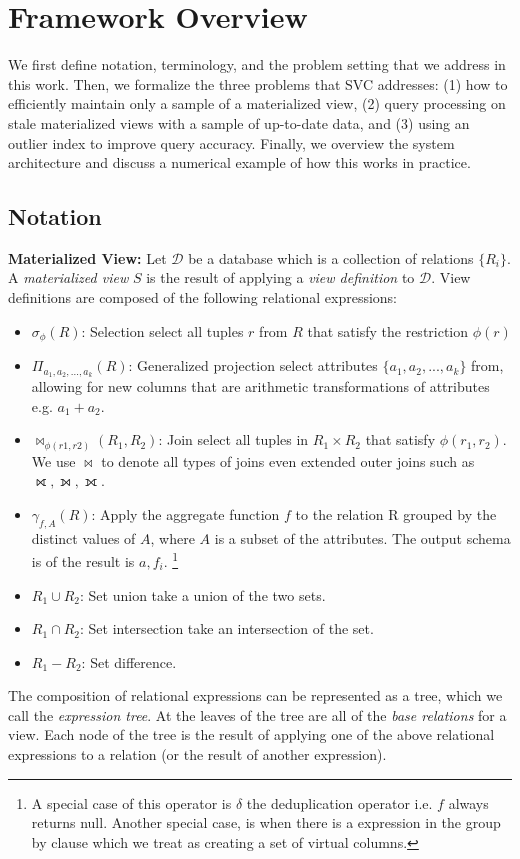 \section{Framework Overview}\label{sec-arch}
We first define notation, terminology, and the problem setting that we address in this work.
Then, we formalize the three problems that SVC addresses: (1) how to efficiently maintain only a sample of a materialized view, (2) query processing on stale materialized views with a sample of up-to-date data, and (3) using an outlier index to improve query accuracy.
Finally, we overview the system architecture and discuss a numerical example of how this works in practice.

\subsection{Notation}\label{notation}
\noindent \textbf{Materialized View:} Let $\mathcal{D}$ be a database which is a collection of relations $\{R_i\}$. A \emph{materialized view} $S$ is the result of applying a \emph{view definition} to $\mathcal{D}$. 
View definitions are composed of the following relational expressions:
\begin{itemize}[noitemsep] \sloppy
	\item $\sigma_{\phi}(R)$: Selection select all tuples $r$ from $R$ that satisfy the restriction $\phi (r)$ 
	\item $\Pi_{a_1,a_2,...,a_k}(R)$: Generalized projection select attributes $\{a_1,a_2,...,a_k\}$ from, allowing for new columns that are arithmetic transformations of attributes e.g. $a_1+a_2$.
	\item $\bowtie_{\phi (r1,r2)}(R_1,R_2)$: Join select all tuples in $R_1 \times R_2$ that satisfy $\phi (r_1,r_2)$. We use $\bowtie$ to denote all types of joins even extended outer joins such as $\rightouterjoin,\leftouterjoin,\fullouterjoin$.
	\item $\gamma_{f,A}(R)$: Apply the aggregate function $f$ to the relation R grouped by the distinct values of $A$, where $A$ is a subset of the attributes. The output schema is of the result is $a, f_i$. \footnote{A special case of this operator is $\delta$ the deduplication operator i.e. $f$ always returns null. Another special case, is when there is a expression in the group by clause which we treat as creating a set of virtual columns.}
	\item $R_1 \cup R_2$: Set union take a union of the two sets.
	\item $R_1 \cap R_2$: Set intersection take an intersection of the set.
	\item $R_1 - R_2$: Set difference.
\end{itemize}
The composition of relational expressions can be represented as a tree, which we call the \emph{expression tree}.
At the leaves of the tree are all of the \emph{base relations} for a view.
Each node of the tree is the result of applying one of the above relational expressions to a relation (or the result of another expression).

